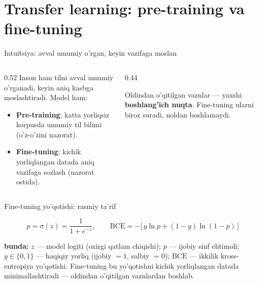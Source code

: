\documentclass[aspectratio=169,11pt]{beamer}
\newcommand{\bunda}[1]{{\small\textbf{bunda:}\; #1}}
\begin{document}
\section[Transfer]{Transfer learning: pre-training va fine-tuning}

\begin{frame}{Intuitsiya: avval umumiy o'rgan, keyin vazifaga moslan}
  \begin{columns}[T]
    \begin{column}{0.52\textwidth}
      \small
      Inson ham tilni avval umumiy o'rganadi, keyin aniq kasbga moslashtiradi.
      Model ham:
      \begin{itemize}\setlength\itemsep{1pt}
        \item \textbf{Pre-training}: katta yorliqsiz korpusda umumiy til bilimi
              (o'z-o'zini nazorat).
        \item \textbf{Fine-tuning}: kichik yorliqlangan datada aniq vazifaga
              sozlash (nazorat ostida).
      \end{itemize}
    \end{column}
    \begin{column}{0.44\textwidth}
      \begin{tcolorbox}[okbox,top=2pt,bottom=2pt]
        \footnotesize
        Oldindan o'qitilgan vaznlar --- yaxshi \textbf{boshlang'ich nuqta}.
        Fine-tuning ularni biroz suradi, noldan boshlamaydi.
      \end{tcolorbox}
    \end{column}
  \end{columns}
\end{frame}

\begin{frame}{Fine-tuning yo'qotishi: rasmiy ta'rif}
  \begin{tcolorbox}[defbox,title={Ta'rif: sigmoid va BCE (ikkilik klassifikatsiya)}]
    \vspace{-0.4em}
    $$ p = \sigma(z) = \frac{1}{1+e^{-z}}, \qquad
       \mathrm{BCE} = -\big[\,y\ln p + (1-y)\ln(1-p)\,\big] $$
  \end{tcolorbox}
  \vspace{2pt}
  \bunda{$z$ --- model logiti (oxirgi qatlam chiqishi); $p$ --- ijobiy sinf
  ehtimoli; $y\in\{0,1\}$ --- haqiqiy yorliq (ijobiy $=1$, salbiy $=0$);
  $\mathrm{BCE}$ --- ikkilik kross-entropiya yo'qotishi.}
  \vspace{4pt}
  \footnotesize Fine-tuning bu yo'qotishni kichik yorliqlangan datada
  minimallashtiradi --- oldindan o'qitilgan vaznlardan boshlab.
\end{frame}
\end{document}

